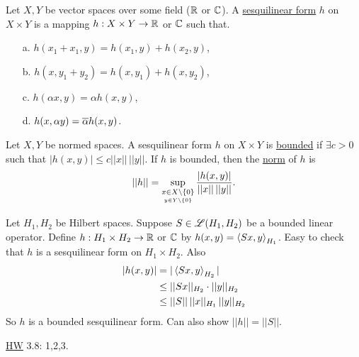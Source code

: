 \documentclass[]{article}
\begin{document}
\begin{definition}
	Let $X,Y$ be vector spaces over some field ($\mathbb{R}$ or $\mathbb{C}$).
	A \ul{sesquilinear form} $h$ on $X\times Y$ is a mapping $h:X\times Y\rightarrow\mathbb{R}$ or $\mathbb{C}$ such that.
	\begin{enumerate}
		\item[a.] $h(x_1+x_1,y) = h(x_1,y)+h(x_2,y)$,
		\item[b.] $h(x,y_1+y_2) = h(x,y_1)+h(x,y_2)$,
		\item[c.] $h(\alpha x,y) = \alpha h(x,y)$,
		\item[d.] $h(x,\alpha y) = \overline{\alpha} h(x,y)$.
	\end{enumerate}
\end{definition}
\begin{definition}
	Let $X,Y$ be normed spaces.
	A sesquilinear form $h$ on $X\times Y$ is \ul{bounded} if $\exists c>0$ such that $|h(x,y)|\leq c||x||\,||y||$.
	If $h$ is bounded, then the \ul{norm} of $h$ is $$||h|| = \sup_{\underset{y\in Y\backslash\left\{ 0 \right\}}{x\in X\backslash\left\{ 0 \right\}}} \frac{|h(x,y)|}{||x||\,||y||}.$$
\end{definition}
\begin{example}
	Let $H_1,H_2$ be Hilbert spaces.
	Suppose $S\in\mathscr{L}(H_1,H_2)$ be a bounded linear operator.
	Define $h:H_1\times H_2\rightarrow\mathbb{R}$ or $\mathbb{C}$ by $h(x,y) = \left\langle Sx,y \right\rangle_{H_1}$.
	Easy to check that $h$ is a sesquilinear form on $H_1\times H_2$. Also
	\begin{align*}
		|h(x,y)| &= |\left\langle Sx,y \right\rangle_{H_2}| \\
				 &\leq ||Sx||_{H_2} \cdot ||y||_{H_2} \\
				 &\leq ||S||\,||x||_{H_1}\,||y||_{H_2}
	\end{align*}
	So $h$ is a bounded sesquilinear form.
	Can also show $||h||=||S||$.
\end{example}

\ul{HW} 3.8: 1,2,3.
\end{document}
